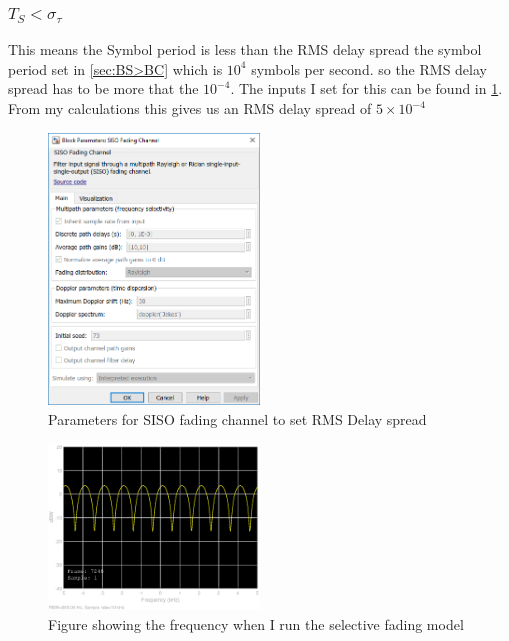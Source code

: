 \documentclass[a4paper,12pt]{scrartcl}
\begin{document}
{{{			\subsubsection{\texorpdfstring{$T_S < \sigma_\tau$}{}}
			{
				This means the Symbol period is less than the RMS delay spread the symbol period set in \cref{sec:BS>BC} which is $10^{4}$ symbols per second. so the RMS delay spread has to be more that the $10^{-4}$. The inputs I set for this can be found in \cref{img:FreqSelectFadeSISOParams}. From my calculations this gives us an RMS delay spread of $5\times10^{-4}$ 
				\begin{figure}
					\centering
					\includegraphics[width=0.5\textwidth]{FrequencySelectiveFadingSISOFadingParameters}
					\caption{Parameters for SISO fading channel to set RMS Delay spread}
					\label{img:FreqSelectFadeSISOParams}
				\end{figure}
			}
			\begin{figure}
				\centering
				\includegraphics[width=0.5\textwidth]{SelectiveFadingFrequencyResponse}
				\caption{Figure showing the frequency when I run the selective fading model}
				\label{fig:SelectFadingFreqResp}
			\end{figure}
			\begin{figure}

\end{figure}}}}
\end{document}
